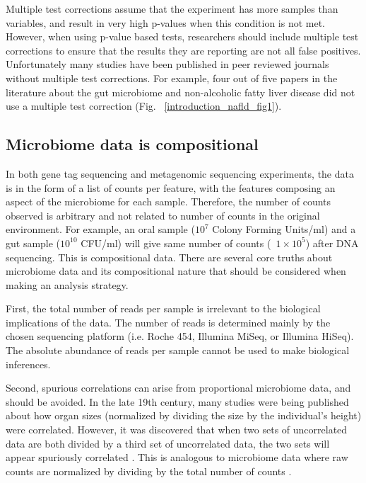 Multiple test corrections assume that the experiment has more samples than variables, and result in very high p-values when this condition is not met. However, when using p-value based tests, researchers should include multiple test corrections to ensure that the results they are reporting are not all false positives. Unfortunately many studies have been published in peer reviewed journals without multiple test corrections. For example, four out of five papers in the literature about the gut microbiome and non-alcoholic fatty liver disease did not use a multiple test correction (Fig. ~\ref{introduction_nafld_fig1}).

\subsection{Microbiome data is compositional}
In both gene tag sequencing and metagenomic sequencing experiments, the data is in the form of a list of counts per feature, with the features composing an aspect of the microbiome for each sample. Therefore, the number of counts observed is arbitrary and not related to number of counts in the original environment. For example, an oral sample ($10^{7}$ Colony Forming Units/ml) and a gut sample ($10^{10}$ CFU/ml) will give same number of counts (~$1 \times 10^{5}$) after DNA sequencing. This is compositional data. There are several core truths about microbiome data and its compositional nature that should be considered when making an analysis strategy.

First, the total number of reads per sample is irrelevant to the biological implications of the data. The number of reads is determined mainly by the chosen sequencing platform (i.e. Roche 454, Illumina MiSeq, or Illumina HiSeq). The absolute abundance of reads per sample cannot be used to make biological inferences.

Second, spurious correlations can arise from proportional microbiome data, and should be avoided. In the late 19th century, many studies were being published about how organ sizes (normalized by dividing the size by the individual's height) were correlated. However, it was discovered that when two sets of uncorrelated data are both divided by a third set of uncorrelated data, the two sets will appear spuriously correlated \cite{pearson1896mathematical}. This is analogous to microbiome data where raw counts are normalized by dividing by the total number of counts \cite{pearson1896mathematical}.

